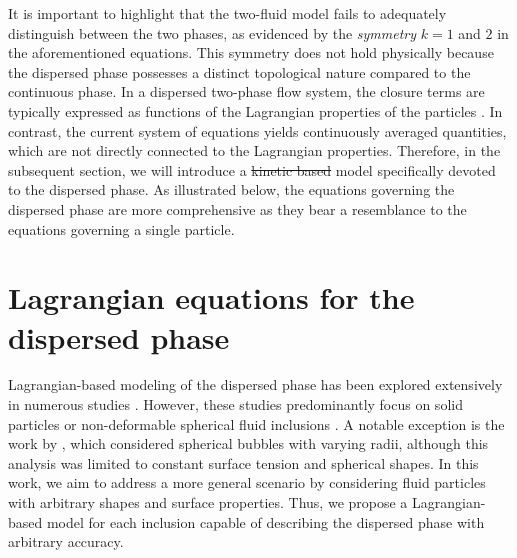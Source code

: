 \documentclass[11pt]{My_preprint}
\providecommand{\DIFadd}[1]{{\protect\color{blue}\uwave{#1}}} %
\providecommand{\DIFdel}[1]{{\protect\color{red}\sout{#1}}}                      %
\providecommand{\DIFaddbegin}{} %
\providecommand{\DIFaddend}{} %
\providecommand{\DIFdelbegin}{} %
\providecommand{\DIFdelend}{} %
\begin{document}
It is important to highlight that the two-fluid model fails to adequately distinguish between the two phases, as evidenced by the \textit{symmetry} $k = 1$ and $2$ in the aforementioned equations. This symmetry does not hold physically because the dispersed phase possesses a distinct topological nature compared to the continuous phase. 
In a dispersed two-phase flow system, the closure terms are typically expressed as functions of the Lagrangian properties of the particles \citep{jackson2000}. In contrast, the current system of equations yields continuously averaged quantities, which are not directly connected to the Lagrangian properties.
Therefore, in the subsequent section, we will introduce a \DIFdelbegin \DIFdel{kinetic based }\DIFdelend \DIFaddbegin \DIFadd{kinetic-based }\DIFaddend model specifically devoted to the dispersed phase. 
As illustrated below, the equations governing the dispersed phase are more comprehensive as they bear a resemblance to the equations governing a single particle.

 

\section{Lagrangian equations for the dispersed phase}
\label{sec:Lagrangian}

Lagrangian-based modeling of the dispersed phase has been explored extensively in numerous studies \citep{buyevich1979flow, lhuillier1992volume, simonin1996, zhang1994averaged, zhang1994ensemble, zhang1997momentum, jackson1997locally, zaepffel2011modelisation}. However, these studies predominantly focus on solid particles \citep{buyevich1979flow, lhuillier1992volume, simonin1996, zhang1994averaged, jackson1997locally} or non-deformable spherical fluid inclusions \citep{zhang1994ensemble, zaepffel2011modelisation}. A notable exception is the work by \citep{zhang1994ensemble}, which considered spherical bubbles with varying radii, although this analysis was limited to constant surface tension and spherical shapes. In this work, we aim to address a more general scenario by considering fluid particles with arbitrary shapes and surface properties. Thus, we propose a Lagrangian-based model for each inclusion capable of describing the dispersed phase with arbitrary accuracy. 
\end{document}
